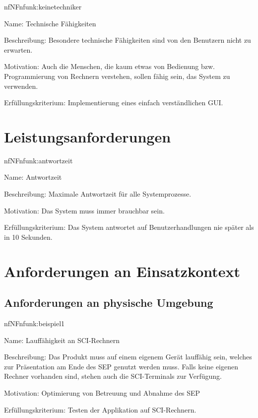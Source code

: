 \begin{description}[leftmargin=5em, style=sameline]	
	\begin{lhp}{nf}{NF}{nfunk:keinetechniker}
		\item [Name:] Technische Fähigkeiten
		\item [Beschreibung:] Besondere technische Fähigkeiten sind von den Benutzern nicht zu erwarten.
		\item [Motivation:] Auch die Menschen, die kaum etwas von Bedienung bzw. Programmierung von Rechnern verstehen, sollen fähig sein, das System zu verwenden.
		\item [Erfüllungskriterium:] Implementierung eines einfach verständlichen GUI. %
	\end{lhp}
\end{description}

\section{Leistungsanforderungen}

\begin{description}[leftmargin=5em, style=sameline]	
	\begin{lhp}{nf}{NF}{nfunk:antwortzeit}
		\item [Name:] Antwortzeit
		\item [Beschreibung:] Maximale Antwortzeit für alle Systemprozesse.
		\item [Motivation:] Das System muss immer brauchbar sein.
		\item [Erfüllungskriterium:] Das System antwortet auf Benutzerhandlungen nie später als in 10 Sekunden.
	\end{lhp}
\end{description}

\section{Anforderungen an Einsatzkontext}

\subsection{Anforderungen an physische Umgebung}

\begin{description}[leftmargin=5em, style=sameline]	
	\begin{lhp}{nf}{NF}{nfunk:beispiel1}
		\item [Name:] Lauffähigkeit an SCI-Rechnern
		\item [Beschreibung:] Das Produkt muss auf einem eigenem Gerät lauffähig sein, welches zur Präsentation am Ende des SEP genutzt werden muss. Falls keine eigenen Rechner vorhanden sind, stehen auch die SCI-Terminals zur Verfügung.
		\item [Motivation:] Optimierung von Betreuung und Abnahme des SEP
		\item [Erfüllungskriterium:] Testen der Applikation auf SCI-Rechnern. %
	\end{lhp}
\end{description}


